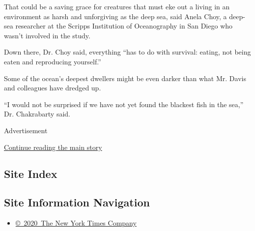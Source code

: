That could be a saving grace for creatures that must eke out a living in
an environment as harsh and unforgiving as the deep sea, said Anela
Choy, a deep-sea researcher at the Scripps Institution of Oceanography
in San Diego who wasn't involved in the study.

Down there, Dr. Choy said, everything ``has to do with survival: eating,
not being eaten and reproducing yourself.''

Some of the ocean's deepest dwellers might be even darker than what Mr.
Davis and colleagues have dredged up.

``I would not be surprised if we have not yet found the blackest fish in
the sea,'' Dr. Chakrabarty said.

Advertisement

\protect\hyperlink{after-bottom}{Continue reading the main story}

\hypertarget{site-index}{%
\subsection{Site Index}\label{site-index}}

\hypertarget{site-information-navigation}{%
\subsection{Site Information
Navigation}\label{site-information-navigation}}

\begin{itemize}
\tightlist
\item
  \href{https://help.nytimes3xbfgragh.onion/hc/en-us/articles/115014792127-Copyright-notice}{©~2020~The
  New York Times Company}
\end{itemize}

